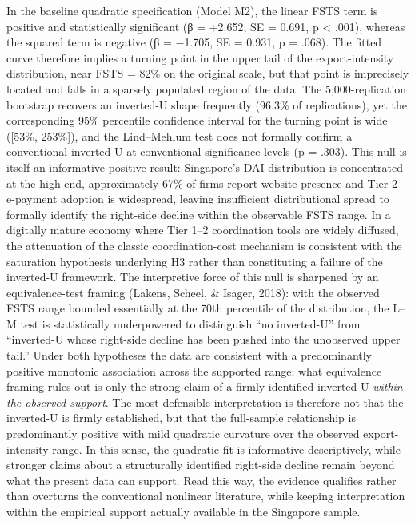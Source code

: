 \documentclass[
  12pt,a4paper]{article}
\begin{document}
In the baseline quadratic specification (Model M2), the linear FSTS term
is positive and statistically significant (β = +2.652, SE = 0.691, p
\textless{} .001), whereas the squared term is negative (β = −1.705, SE
= 0.931, p = .068). The fitted curve therefore implies a turning point
in the upper tail of the export-intensity distribution, near FSTS = 82\%
on the original scale, but that point is imprecisely located and falls
in a sparsely populated region of the data. The 5,000-replication
bootstrap recovers an inverted-U shape frequently (96.3\% of
replications), yet the corresponding 95\% percentile confidence interval
for the turning point is wide ({[}53\%, 253\%{]}), and the Lind--Mehlum
test does not formally confirm a conventional inverted-U at conventional
significance levels (p = .303). This null is itself an informative
positive result: Singapore's DAI distribution is concentrated at the
high end, approximately 67\% of firms report website presence and Tier 2
e-payment adoption is widespread, leaving insufficient distributional
spread to formally identify the right-side decline within the observable
FSTS range. In a digitally mature economy where Tier 1--2 coordination
tools are widely diffused, the attenuation of the classic
coordination-cost mechanism is consistent with the saturation hypothesis
underlying H3 rather than constituting a failure of the inverted-U
framework. The interpretive force of this null is sharpened by an
equivalence-test framing (Lakens, Scheel, \& Isager, 2018): with the
observed FSTS range bounded essentially at the 70th percentile of the
distribution, the L--M test is statistically underpowered to distinguish
``no inverted-U'' from ``inverted-U whose right-side decline has been
pushed into the unobserved upper tail.'' Under both hypotheses the data
are consistent with a predominantly positive monotonic association
across the supported range; what equivalence framing rules out is only
the strong claim of a firmly identified inverted-U \emph{within the
observed support}. The most defensible interpretation is therefore not
that the inverted-U is firmly established, but that the full-sample
relationship is predominantly positive with mild quadratic curvature
over the observed export-intensity range. In this sense, the quadratic
fit is informative descriptively, while stronger claims about a
structurally identified right-side decline remain beyond what the
present data can support. Read this way, the evidence qualifies rather
than overturns the conventional nonlinear literature, while keeping
interpretation within the empirical support actually available in the
Singapore sample.
\end{document}
